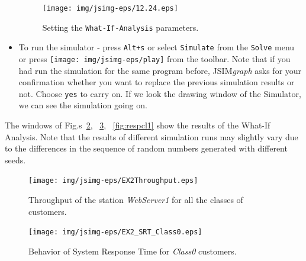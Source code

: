 \begin{itemize}
\begin{figure}[htb]
    \begin{center}
        \texttt{[image: img/jsimg-eps/12.24.eps]}
    \end{center}
    \caption{Setting the \texttt{What-If-Analysis} parameters.}
    \label{fig:wiaparam}
\end{figure}
\item To run the simulator - press \texttt{Alt+s} or select
\texttt{Simulate} from the \texttt{Solve} menu or press
\texttt{[image: img/jsimg-eps/play]}
from the toolbar. Note that if you had run the simulation for the
same program before, JSIM\emph{graph} asks for your confirmation
whether you want to replace the previous simulation results or
not. Choose \texttt{yes} to carry on. If we look the drawing
window of the Simulator, we can see the simulation going on.
\end{itemize}
The windows of Fig.s~\ref{fig:throughbehav}, ~\ref{fig:respcl0},
~\ref{fig:respcl1} show the results of the What-If Analysis. Note
that the results of different simulation runs may slightly vary
due to the differences in the sequence of random numbers generated
with different seeds.
\begin{figure}[htb]
    \begin{center}
        \texttt{[image: img/jsimg-eps/EX2Throughput.eps]}
    \end{center}
    \caption{Throughput of the station \emph{WebServer1} for all the classes of customers.}
    \label{fig:throughbehav}
\end{figure}


\begin{figure}[htb]
    \begin{center}
        \texttt{[image: img/jsimg-eps/EX2\_SRT\_Class0.eps]}
    \end{center}
    \caption{Behavior of System Response Time for \emph{Class0} customers.}
    \label{fig:respcl0}
\end{figure}

